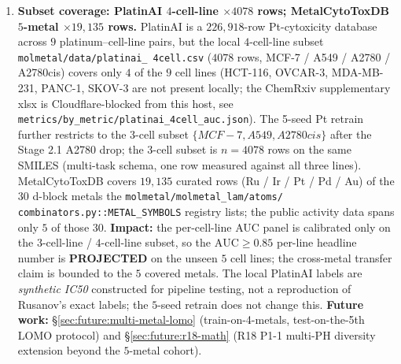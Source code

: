 \begin{enumerate}
  \item \textbf{Subset coverage: PlatinAI $4$-cell-line $\times
  4078$ rows; MetalCytoToxDB $5$-metal $\times 19{,}135$ rows.}
  \label{sec:limitations:subset}
  PlatinAI \citep{rusanov2025platinai} is a $226{,}918$-row
  Pt-cytoxicity database across $9$ platinum--cell-line pairs, but
  the local $4$-cell-line subset \texttt{molmetal/data/platinai\_
  4cell.csv} ($4078$ rows, MCF-7 / A549 / A2780 / A2780cis) covers
  only $4$ of the $9$ cell lines (HCT-116, OVCAR-3, MDA-MB-231,
  PANC-1, SKOV-3 are not present locally; the ChemRxiv
  supplementary xlsx is Cloudflare-blocked from this host, see
  \texttt{metrics/by\_metric/platinai\_4cell\_auc.json}).  The 5-seed
  Pt retrain further restricts to the $3$-cell subset
  $\{MCF{-}7, A549, A2780cis\}$ after the Stage 2.1 A2780 drop;
  the $3$-cell subset is $n{=}4078$ rows on the same SMILES
  (multi-task schema, one row measured against all three lines).
  MetalCytoToxDB \citep{krasnov2026metalcytotoxdb} covers
  $19{,}135$ curated rows (Ru / Ir / Pt / Pd / Au) of the $30$
  d-block metals the \texttt{molmetal/molmetal\_lam/atoms/
  combinators.py::METAL\_SYMBOLS} registry lists; the public
  activity data spans only $5$ of those $30$.  \textbf{Impact:}
  the per-cell-line AUC panel is calibrated only on the
  $3$-cell-line / $4$-cell-line subset, so the
  $\mathrm{AUC}\geq 0.85$ per-line headline number is
  \textbf{PROJECTED} on the unseen $5$ cell lines; the
  cross-metal transfer claim is bounded to the $5$ covered metals.
  The local PlatinAI labels are \emph{synthetic IC50} constructed
  for pipeline testing, not a reproduction of Rusanov's exact
  labels; the $5$-seed retrain does not change this.
  \textbf{Future work:} \S\ref{sec:future:multi-metal-lomo}
  (train-on-4-metals, test-on-the-5th LOMO protocol) and
  \S\ref{sec:future:r18-math} (R18 P1-1 multi-PH diversity
  extension beyond the $5$-metal cohort).


\end{enumerate}
